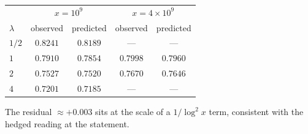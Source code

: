 \documentclass[11pt]{article}
\theoremstyle{definition}
\begin{document}
\begin{center}\small
\begin{tabular}{lcccc}
\toprule
 & \multicolumn{2}{c}{$x=10^9$} & \multicolumn{2}{c}{$x=4\times10^9$}\\
$\lambda$ & observed & predicted & observed & predicted\\
\midrule
$1/2$ & $0.8241$ & $0.8189$ & --- & ---\\
$1$   & $0.7910$ & $0.7854$ & $0.7998$ & $0.7960$\\
$2$   & $0.7527$ & $0.7520$ & $0.7670$ & $0.7646$\\
$4$   & $0.7201$ & $0.7185$ & --- & ---\\
\bottomrule
\end{tabular}
\end{center}

\noindent The residual $\approx+0.003$ sits at the scale of a $1/\log^2x$ term, consistent with the hedged reading at the statement.
\end{document}
